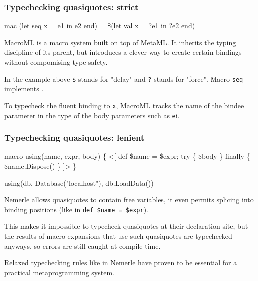 \documentclass[hyperref={bookmarks=false}]{beamer}
\begin{document}
\begin{frame}[fragile]
\frametitle{Typechecking quasiquotes: strict}

\begin{lstlistinglike}
\begin{semiverbatim}
mac (let seq x = e1 in e2 end) =
   \$(let val x = ?e1 in ?e2 end)
\end{semiverbatim}
\end{lstlistinglike}

MacroML is a macro system built on top of MetaML. It inherits the typing discipline of its parent,
but introduces a clever way to create certain bindings without compomising type safety.

In the example above \texttt{\$} stands for "delay" and \texttt{?} stands for "force". Macro \texttt{seq}
implements \text{\color{red}{(wtf does it implement?)}}.

To typecheck the fluent binding to \texttt{x}, MacroML tracks the name of the bindee parameter in the type
of the body parameters such as \texttt{e}i.
\end{frame}

\begin{frame}[fragile]
\frametitle{Typechecking quasiquotes: lenient}

\begin{lstlistinglike}
\begin{semiverbatim}
macro using(name, expr, body) \{
  <[
    def \$name = \$expr;
    try \{ \$body \} finally \{ \$name.Dispose() \}
  ]>
\}

using(db, Database("localhost"), db.LoadData())
\end{semiverbatim}
\end{lstlistinglike}

Nemerle allows quasiquotes to contain free variables, it even permits
splicing into binding positions (like in \texttt{def \$name = \$expr}).

This makes it impossible to typecheck quasiquotes at their declaration site,
but the results of macro expansions that use such quasiquotes are typechecked anyways,
so errors are still caught at compile-time.

Relaxed typechecking rules like in Nemerle have proven to be essential
for a practical metaprogramming system.
\end{frame}
\end{document}
